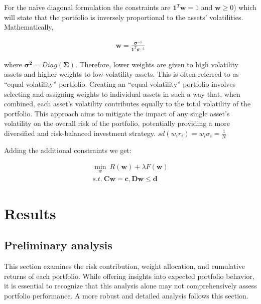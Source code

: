 \documentclass[12pt,preprint, authoryear]{elsarticle}
\numberwithin{equation}{section}
\numberwithin{figure}{section}
\numberwithin{table}{section}
\begin{document}
For the \textnormal{na\"{i}ve} diagonal formulation the constraints are
\(\boldsymbol{1}^T \boldsymbol{w} =1\) and \(\boldsymbol{w} \ge 0\))
which will state that the portfolio is inversely proportional to the
assets' volatilities. Mathematically,

\begin{align}
\boldsymbol{w} =\frac{\boldsymbol{\sigma}^{-1}}{\boldsymbol{1}^T \boldsymbol{\sigma}^{-1}}
\end{align}

where \(\boldsymbol{\sigma^2}=Diag(\boldsymbol{\Sigma})\). Therefore,
lower weights are given to high volatility assets and higher weights to
low volatility assets. This is often referred to as ``equal volatility''
portfolio. Creating an ``equal volatility'' portfolio involves selecting
and assigning weights to individual assets in such a way that, when
combined, each asset's volatility contributes equally to the total
volatility of the portfolio. This approach aims to mitigate the impact
of any single asset's volatility on the overall risk of the portfolio,
potentially providing a more diversified and risk-balanced investment
strategy. \(sd(w_i r_i)=w_i \sigma_i=\frac{1}{N}\)

Adding the additional constraints we get:

\begin{align}
\min_{w}\ R(\boldsymbol{w}) + \lambda F(\boldsymbol{w})  \\
s.t.\ \boldsymbol{Cw}=\boldsymbol{c}, \boldsymbol{Dw}\le\boldsymbol{d}
\end{align}

\hypertarget{results}{%
\section{\texorpdfstring{Results \label{-}}{Results }}\label{results}}

\hypertarget{preliminary-analysis}{%
\subsection{Preliminary analysis}\label{preliminary-analysis}}

This section examines the risk contribution, weight allocation, and
cumulative returns of each portfolio. While offering insights into
expected portfolio behavior, it is essential to recognize that this
analysis alone may not comprehensively assess portfolio performance. A
more robust and detailed analysis follows this section.
\end{document}
